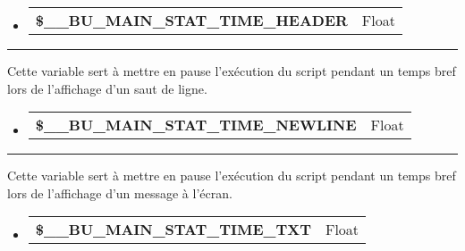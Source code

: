 \documentclass[a4paper,10pt]{article}
\begin{document}
\begin{justify}
     \begin{itemize}
        \item
        {
            \begin{tabular}{l|l}
                \textbf{\color{orange}\$\_\_BU\_MAIN\_STAT\_TIME\_HEADER}   & Float\\[1\baselineskip]
            \end{tabular}
        }
    \end{itemize}
\end{justify}


\par\noindent\rule{\textwidth}{0.4pt}

\begin{justify}
    Cette variable sert à mettre en pause l'exécution du script pendant un temps bref lors de l'affichage d'un saut de ligne.
\end{justify}

\begin{justify}
     \begin{itemize}
        \item
        {
            \begin{tabular}{l|l}
                \textbf{\color{orange}\$\_\_BU\_MAIN\_STAT\_TIME\_NEWLINE}  & Float\\[1\baselineskip]
            \end{tabular}
        }
    \end{itemize}
\end{justify}


\par\noindent\rule{\textwidth}{0.4pt}

\begin{justify}
    Cette variable sert à mettre en pause l'exécution du script pendant un temps bref lors de l'affichage d'un message à l'écran.
\end{justify}

\begin{justify}
     \begin{itemize}
        \item
        {
            \begin{tabular}{l|l}
                \textbf{\color{orange}\$\_\_BU\_MAIN\_STAT\_TIME\_TXT}  & Float\\[1\baselineskip]
            \end{tabular}
        }
    \end{itemize}
\end{justify}
\end{document}
